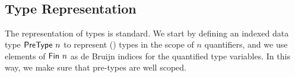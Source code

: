 \begin{code}[hide]%
\>[0]\AgdaSymbol{\{-\#}\AgdaSpace{}%
\AgdaSpace{}%
\AgdaSpace{}%
\AgdaSymbol{\#-\}}\<%
\\
\>[0]\AgdaSpace{}%
\AgdaSpace{}%
\<%
\\
\>[0]\AgdaSpace{}%
\AgdaSpace{}%
\<%
\\
\>[0]\AgdaSpace{}%
\AgdaSpace{}%
\AgdaSpace{}%
\AgdaSpace{}%
\AgdaSymbol{(}\AgdaSymbol{;}\AgdaSpace{}%
\AgdaSymbol{;}\AgdaSpace{}%
\AgdaSymbol{;}\AgdaSpace{}%
\AgdaSymbol{)}\<%
\\
\>[0]\AgdaSpace{}%
\AgdaSpace{}%
\<%
\end{code}

\subsection{Type Representation}
\label{sec:type-agda}

The representation of types is standard. We start by defining an indexed data
type $\AgdaDatatype{PreType}~n$ to represent (\LCC) types in the scope of $n$
quantifiers, and we use elements of $\AgdaDatatype{Fin}~n$ as de Bruijn indices
for the quantified type variables. In this way, we make sure that pre-types are
well scoped.

